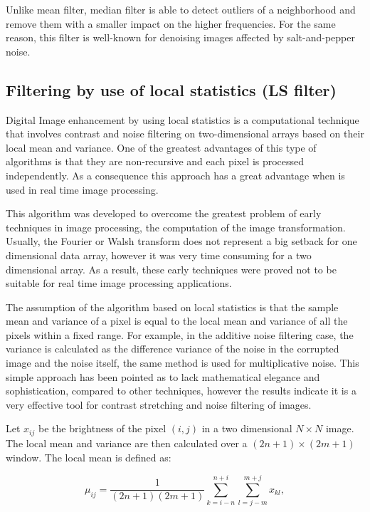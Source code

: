Unlike mean filter, median filter is able to detect outliers of a neighborhood and remove them with a smaller impact on the higher frequencies. For the same reason, this filter is well-known for denoising images affected by salt-and-pepper noise. 


\subsection{Filtering by use of local statistics (LS filter)}

Digital Image enhancement by using local statistics is a computational technique that involves contrast and noise filtering on two-dimensional arrays based on their local mean and variance. One of the greatest advantages of this type of algorithms is that they are non-recursive and each pixel is processed independently. As a consequence this approach has a great advantage when is used in real time image processing.

This algorithm was developed to overcome the greatest problem of early techniques in image processing, the computation of the image transformation. Usually, the Fourier or Walsh transform does not represent a big setback for one dimensional data array, however it was very time consuming for a two dimensional array. As a result, these early techniques were proved not to be suitable for real time image processing applications.

The assumption of the algorithm based on local statistics is that the sample mean and variance of a pixel is equal to the local mean and variance of all the pixels within a fixed range. For example, in the additive noise filtering case, the variance is calculated as the difference variance of the noise in the corrupted image and the noise itself, the same method is used for multiplicative noise.
This simple approach has been pointed as to lack mathematical elegance and sophistication, compared to other techniques, however the results indicate it is a very effective tool for contrast stretching and noise filtering of images.

Let $x_{ij}$ be the brightness of the pixel $(i,j)$ in a two dimensional $N\times N$ image. The local mean and variance are then calculated over a $(2n+1) \times (2m+1)$ window. The local mean is defined as:

\begin{equation}
    \mu_{ij}=\dfrac{1}{(2n+1)(2m+1)}\sum_{k=i-n}^{n+i}\sum_{l=j-m}^{m+j}{x_{kl}},
    \label{eq:ls_filter_1}
\end{equation}

